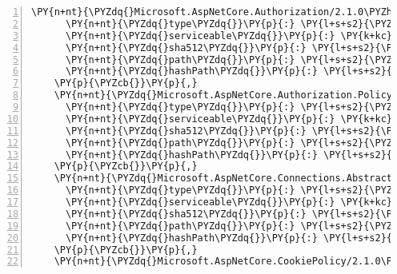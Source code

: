 \begin{Verbatim}[commandchars=\\\{\},numbers=left,firstnumber=1,stepnumber=1,numberblanklines=0]
    \PY{n+nt}{\PYZdq{}Microsoft.AspNetCore.Authorization/2.1.0\PYZhy{}rc1\PYZhy{}final\PYZdq{}}\PY{p}{:} \PY{p}{\PYZob{}}
      \PY{n+nt}{\PYZdq{}type\PYZdq{}}\PY{p}{:} \PY{l+s+s2}{\PYZdq{}package\PYZdq{}}\PY{p}{,}
      \PY{n+nt}{\PYZdq{}serviceable\PYZdq{}}\PY{p}{:} \PY{k+kc}{true}\PY{p}{,}
      \PY{n+nt}{\PYZdq{}sha512\PYZdq{}}\PY{p}{:} \PY{l+s+s2}{\PYZdq{}sha512\PYZhy{}hZCICqFF0i/00luETgecwGYN5MRJzqPPBZEIyOFMW18lnjQIWSBz8QdeURwXB9soZbjUYo2M0T7FcN5gvRaXMQ==\PYZdq{}}\PY{p}{,}
      \PY{n+nt}{\PYZdq{}path\PYZdq{}}\PY{p}{:} \PY{l+s+s2}{\PYZdq{}microsoft.aspnetcore.authorization/2.1.0\PYZhy{}rc1\PYZhy{}final\PYZdq{}}\PY{p}{,}
      \PY{n+nt}{\PYZdq{}hashPath\PYZdq{}}\PY{p}{:} \PY{l+s+s2}{\PYZdq{}microsoft.aspnetcore.authorization.2.1.0\PYZhy{}rc1\PYZhy{}final.nupkg.sha512\PYZdq{}}
    \PY{p}{\PYZcb{}}\PY{p}{,}
    \PY{n+nt}{\PYZdq{}Microsoft.AspNetCore.Authorization.Policy/2.1.0\PYZhy{}rc1\PYZhy{}final\PYZdq{}}\PY{p}{:} \PY{p}{\PYZob{}}
      \PY{n+nt}{\PYZdq{}type\PYZdq{}}\PY{p}{:} \PY{l+s+s2}{\PYZdq{}package\PYZdq{}}\PY{p}{,}
      \PY{n+nt}{\PYZdq{}serviceable\PYZdq{}}\PY{p}{:} \PY{k+kc}{true}\PY{p}{,}
      \PY{n+nt}{\PYZdq{}sha512\PYZdq{}}\PY{p}{:} \PY{l+s+s2}{\PYZdq{}sha512\PYZhy{}S95x+tpnLyuexUSNYZm03QjCTXUh+8H3VvtGFK1TKD1oUj5/+q93JnJ9U0QmCqHEURm7wJLhgDcPqgBjWqmgXA==\PYZdq{}}\PY{p}{,}
      \PY{n+nt}{\PYZdq{}path\PYZdq{}}\PY{p}{:} \PY{l+s+s2}{\PYZdq{}microsoft.aspnetcore.authorization.policy/2.1.0\PYZhy{}rc1\PYZhy{}final\PYZdq{}}\PY{p}{,}
      \PY{n+nt}{\PYZdq{}hashPath\PYZdq{}}\PY{p}{:} \PY{l+s+s2}{\PYZdq{}microsoft.aspnetcore.authorization.policy.2.1.0\PYZhy{}rc1\PYZhy{}final.nupkg.sha512\PYZdq{}}
    \PY{p}{\PYZcb{}}\PY{p}{,}
    \PY{n+nt}{\PYZdq{}Microsoft.AspNetCore.Connections.Abstractions/2.1.0\PYZhy{}rc1\PYZhy{}final\PYZdq{}}\PY{p}{:} \PY{p}{\PYZob{}}
      \PY{n+nt}{\PYZdq{}type\PYZdq{}}\PY{p}{:} \PY{l+s+s2}{\PYZdq{}package\PYZdq{}}\PY{p}{,}
      \PY{n+nt}{\PYZdq{}serviceable\PYZdq{}}\PY{p}{:} \PY{k+kc}{true}\PY{p}{,}
      \PY{n+nt}{\PYZdq{}sha512\PYZdq{}}\PY{p}{:} \PY{l+s+s2}{\PYZdq{}sha512\PYZhy{}qbTZd9w1o6Yln4DJJUQ6NsycO5lST9hyAjIm9RleL8cwYGFJ4izUzXw6fttO/EtdZXaVVyqaTMbbP4cJsJAy6A==\PYZdq{}}\PY{p}{,}
      \PY{n+nt}{\PYZdq{}path\PYZdq{}}\PY{p}{:} \PY{l+s+s2}{\PYZdq{}microsoft.aspnetcore.connections.abstractions/2.1.0\PYZhy{}rc1\PYZhy{}final\PYZdq{}}\PY{p}{,}
      \PY{n+nt}{\PYZdq{}hashPath\PYZdq{}}\PY{p}{:} \PY{l+s+s2}{\PYZdq{}microsoft.aspnetcore.connections.abstractions.2.1.0\PYZhy{}rc1\PYZhy{}final.nupkg.sha512\PYZdq{}}
    \PY{p}{\PYZcb{}}\PY{p}{,}
    \PY{n+nt}{\PYZdq{}Microsoft.AspNetCore.CookiePolicy/2.1.0\PYZhy{}rc1\PYZhy{}final\PYZdq{}}\PY{p}{:} \PY{p}{\PYZob{}}

\end{Verbatim}
